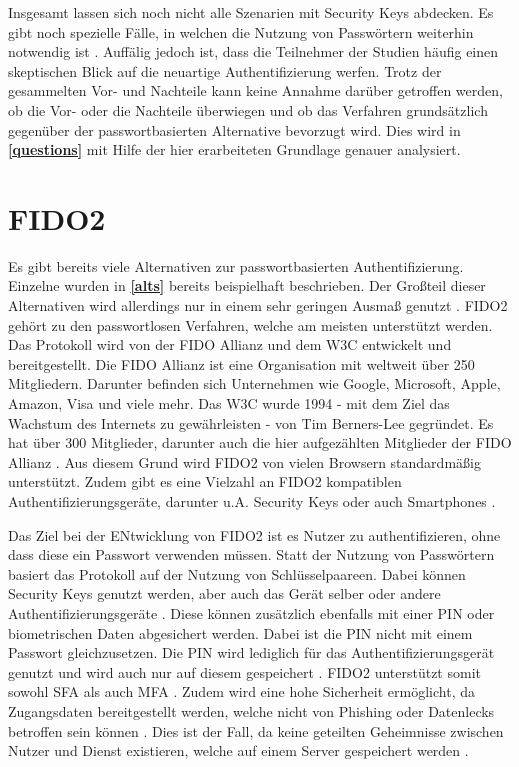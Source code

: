 Insgesamt lassen sich noch nicht alle Szenarien mit Security Keys abdecken. Es gibt noch spezielle Fälle, in welchen die Nutzung von Passwörtern weiterhin notwendig ist \cite{lyastani2020fido2}. Auffälig jedoch ist, dass die Teilnehmer der Studien häufig einen skeptischen Blick auf die neuartige Authentifizierung werfen. Trotz der gesammelten Vor- und Nachteile kann keine Annahme darüber getroffen werden, ob die Vor- oder die Nachteile überwiegen und ob das Verfahren grundsätzlich gegenüber der passwortbasierten Alternative bevorzugt wird. Dies wird in \textbf{\ref{questions}} mit Hilfe der hier erarbeiteten Grundlage genauer analysiert.

\section{FIDO2} \label{fido2}

Es gibt bereits viele Alternativen zur passwortbasierten Authentifizierung. Einzelne wurden in \textbf{\ref{alts}} bereits beispielhaft beschrieben. Der Großteil dieser Alternativen wird allerdings nur in einem sehr geringen Ausmaß genutzt \cite{farke2020you}. \ac{FIDO}2 gehört zu den passwortlosen Verfahren, welche am meisten unterstützt werden. Das Protokoll wird von der \ac{FIDO} Allianz und dem \ac{W3C} entwickelt und bereitgestellt. Die \ac{FIDO} Allianz ist eine Organisation mit weltweit über 250 Mitgliedern. Darunter befinden sich Unternehmen wie Google, Microsoft, Apple, Amazon, Visa und viele mehr. Das \ac{W3C} wurde 1994 - mit dem Ziel das Wachstum des Internets zu gewährleisten - von Tim Berners-Lee gegründet. Es hat über 300 Mitglieder, darunter auch die hier aufgezählten Mitglieder der \ac{FIDO} Allianz  \cite{lyastani2020fido2} \cite{farke2020you} \cite{w3cabout}. Aus diesem Grund wird \ac{FIDO}2 von vielen Browsern standardmäßig unterstützt. Zudem gibt es eine Vielzahl an \ac{FIDO}2 kompatiblen Authentifizierungsgeräte, darunter u.A. Security Keys oder auch Smartphones \cite{lyastani2020fido2}.

Das Ziel bei der ENtwicklung von \ac{FIDO}2 ist es Nutzer zu authentifizieren, ohne dass diese ein Passwort verwenden müssen. Statt der Nutzung von Passwörtern basiert das Protokoll auf der Nutzung von Schlüsselpaareen. Dabei können Security Keys genutzt werden, aber auch das Gerät selber oder andere Authentifizierungsgeräte \cite{barbosa2021provable} \cite{morii2017research}. Diese können zusätzlich ebenfalls mit einer PIN oder biometrischen Daten abgesichert werden. Dabei ist die PIN nicht mit einem Passwort gleichzusetzen. Die PIN wird lediglich für das Authentifizierungsgerät genutzt und wird auch nur auf diesem gespeichert \cite{farke2020you} \cite{barbosa2021provable}. \ac{FIDO}2 unterstützt somit sowohl \ac{SFA} als auch \ac{MFA} \cite{lyastani2020fido2} \cite{farke2020you}. Zudem wird eine hohe Sicherheit ermöglicht, da Zugangsdaten bereitgestellt werden, welche nicht von Phishing oder Datenlecks betroffen sein können \cite{lyastani2020fido2}. Dies ist der Fall, da keine geteilten Geheimnisse zwischen Nutzer und Dienst existieren, welche auf einem Server gespeichert werden \cite{morii2017research}. 

